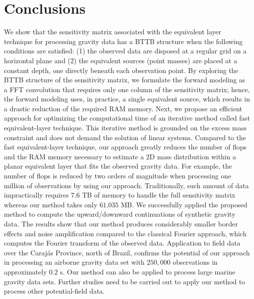 \section{Conclusions}

We show that the sensitivity matrix associated with the equivalent layer technique 
for processing gravity data has a BTTB structure when the following conditions are
satisfied: (1) the observed data are disposed at a regular grid on a horizontal plane
and (2) the equivalent sources (point masses) are placed at a constant depth, one directly 
beneath each observation point.
By exploring the BTTB structure of the sensitivity matrix, we formulate the forward modeling as a 
FFT convolution that requires only one column of the sensitivity matrix; 
hence, the forward modeling uses, in practice, a single equivalent source,
which results in a drastic reduction of the required RAM memory. 
Next, we propose an efficient approach for optimizing the computational time of an 
iterative method called fast equivalent-layer technique.
This iterative method is grounded on the excess mass constraint and does not demand the solution of 
linear systems.
Compared to the fast equivalent-layer technique, 
our approach greatly reduces the number of flops and the RAM memory necessary to estimate a 
2D mass distribution within a planar equivalent layer that fits the observed gravity data. 
For example, the number of flops is reduced by two orders 
of magnitude when processing one million of observations by using our approach. 
Traditionally, such amount of data impractically requires $7.6$ TB of memory to handle 
the full sensitivity matrix whereas our method takes only $61.035$ MB.
We successfully applied the proposed method to compute the upward/downward continuations of 
synthetic gravity data. 
The results show that our method produces considerably smaller border effects and 
noise amplification compared to the classical Fourier approach, 
which computes the Fourier transform of the observed data.
Application to field data over the Caraj{\'a}s Province, north of Brazil, 
confirms the potential of our approach in processing an airborne gravity data set with $250,000$ observations in approximately $0.2$ s. 
Our method can also be applied to process large marine gravity data sets. 
Further studies need to be carried out to apply our method to process 
other potential-field data.